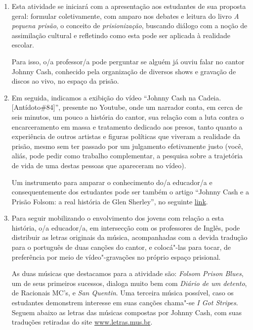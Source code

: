 \documentclass[11pt]{extarticle}
\begin{document}
\begin{enumerate}
\item Esta atividade se iniciará com a apresentação aos
estudantes de sua proposta geral: formular coletivamente, com amparo nos
debates e leitura do livro \emph{A pequena prisão}, o conceito de
\emph{prisionização}, buscando diálogo com a noção de assimilação cultural e
refletindo como esta pode ser aplicada à realidade escolar. 

Para isso,
o/a professor/a pode perguntar se alguém já ouviu falar no cantor Johnny
Cash, conhecido pela organização de diversos shows e gravação de discos
ao vivo, no espaço da prisão. 

\item Em seguida, indicamos a exibição do vídeo
``Johnny Cash na Cadeia. {[}Antídoto\#84{]}'', presente no Youtube, onde
um narrador conta, em cerca de seis minutos, um pouco a história do
cantor, sua relação com a luta contra o encarceramento em massa e
tratamento dedicado aos presos, tanto quanto a experiência de outros
artistas e figuras políticas que viveram a realidade da prisão, mesmo
sem ter passado por um julgamento efetivamente justo (você, aliás, pode
pedir como trabalho complementar, a pesquisa sobre a trajetória de vida
de uma destas pessoas que apareceram no vídeo).

Um instrumento para
amparar o conhecimento do/a educador/a e consequentemente dos estudantes
pode ser também o artigo ``Johnny Cash e a Prisão Folsom: a real
história de Glen Sherley'', no seguinte
\href{https://canalcienciascriminais.jusbrasil.com.br/artigos/409579800/johnny-cash-e-a-prisao-folsom-a-real-historia-de-glen-sherley}{link}.

\item Para seguir mobilizando o envolvimento dos jovens com relação a esta
história, o/a educador/a, em intersecção com os professores de Inglês, pode 
distribuir as letras originais da música,
acompanhadas com a devida tradução para o português de duas canções do
cantor, e colocá"-las para tocar, de preferência por meio de
vídeo"-gravações no próprio espaço prisional. 

As duas músicas que
destacamos para a atividade são: \emph{Folsom Prison Blues}, um de seus
primeiros sucessos, dialoga muito bem com \emph{Diário de um detento}, de
Racionais MC's, e \emph{San Quentin}. Uma terceira música possível, caso
os estudantes demonstrem interesse em suas canções chama"-se \emph{I Got
Stripes}. Seguem abaixo as letras das músicas compostas por Johnny Cash,
com suas traduções retiradas do site
\url{www.letras.mus.br}.


\end{enumerate}
\end{document}

